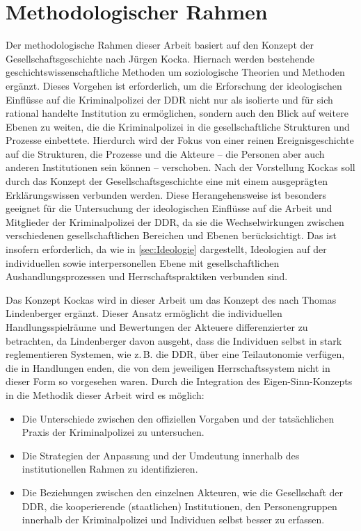 \section{Methodologischer Rahmen}
Der methodologische Rahmen dieser Arbeit basiert auf den Konzept der Gesellschaftsgeschichte nach Jürgen Kocka. %
Hiernach werden bestehende geschichtswissenschaftliche Methoden um soziologische Theorien und Methoden ergänzt.
Dieses Vorgehen ist erforderlich, um die Erforschung der ideologischen Einflüsse auf die Kriminalpolizei der DDR nicht nur als isolierte und für sich rational handelte Institution zu ermöglichen, sondern auch den Blick auf weitere Ebenen zu weiten, die die Kriminalpolizei in die gesellschaftliche Strukturen und Prozesse einbettete. 
Hierdurch wird der Fokus von einer reinen Ereignisgeschichte auf die Strukturen, die Prozesse und die Akteure -- die Personen aber auch anderen Institutionen sein können -- verschoben. 
Nach der Vorstellung Kockas soll durch das Konzept der Gesellschaftsgeschichte eine  mit einem ausgeprägten Erklärungswissen %
verbunden werden. %
Diese Herangehensweise ist besonders geeignet für die Untersuchung der ideologischen Einflüsse auf die Arbeit und Mitglieder der Kriminalpolizei der DDR, da sie die Wechselwirkungen zwischen verschiedenen gesellschaftlichen Bereichen und Ebenen berücksichtigt.
Das ist insofern erforderlich, da wie in \cref{sec:Ideologie} dargestellt, Ideologien auf der individuellen sowie interpersonellen Ebene mit gesellschaftlichen Aushandlungsprozessen und Herrschaftspraktiken\autocite[siehe hierzu][21-23]{Lindenberger1999} %
verbunden sind. %
\par Das Konzept Kockas wird in dieser Arbeit um das Konzept des \autocite{Lindenberger1999} nach Thomas Lindenberger ergänzt.
Dieser Ansatz ermöglicht die individuellen Handlungsspielräume und Bewertungen der Akteuere differenzierter zu betrachten, da Lindenberger davon ausgeht, dass die Individuen selbst in stark reglementieren Systemen, wie z.\,B. die DDR, über eine Teilautonomie verfügen, die in Handlungen enden, die von dem jeweiligen Herrschaftssystem nicht in dieser Form so vorgesehen waren.\autocite[24]{Lindenberger1999}
Durch die Integration des Eigen-Sinn-Konzepts in die Methodik dieser Arbeit wird es möglich:
\begin{itemize}
  \item Die Unterschiede zwischen den offiziellen Vorgaben und der tatsächlichen Praxis der Kriminalpolizei zu untersuchen.
  \item Die Strategien der Anpassung und der Umdeutung innerhalb des institutionellen Rahmen zu identifizieren.
  \item Die Beziehungen zwischen den einzelnen Akteuren, wie die Gesellschaft der DDR, die kooperierende (staatlichen) Institutionen, den Personengruppen innerhalb der Kriminalpolizei und Individuen selbst besser zu erfassen.
\end{itemize}
